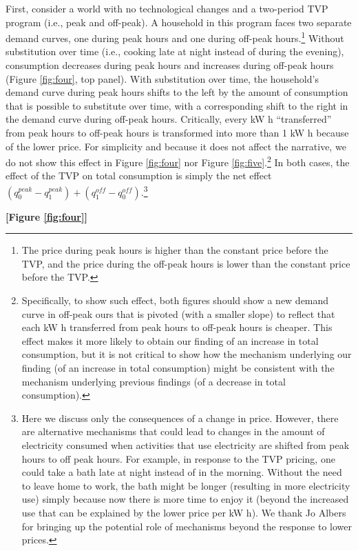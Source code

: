 \documentclass[12pt]{article}
\begin{document}
First, consider a world with no technological changes and a two-period TVP program (i.e., peak and off-peak). A household in this program faces two separate demand curves, one during peak hours and one during off-peak hours.\footnote{The price during peak hours is higher than the constant price before the TVP, and the price during the off-peak hours is lower than the constant price before the TVP.} Without substitution over time (i.e., cooking late at night instead of during the evening), consumption decreases during peak hours and increases during off-peak hours (Figure \ref{fig:four}, top panel). With substitution over time, the household’s demand curve during peak hours shifts to the left by the amount of consumption that is possible to substitute over time, with a corresponding shift to the right in the demand curve during off-peak hours. Critically, every kW h \enquote{transferred} from peak hours to off-peak hours is transformed into more than 1 kW h because of the lower price. For simplicity and because it does not affect the narrative, we do not show this effect in Figure \ref{fig:four} nor Figure \ref{fig:five}.\footnote{Specifically, to show such effect, both figures should show a new demand curve in off-peak ours that is pivoted (with a smaller slope) to reflect that each kW h transferred from peak hours to off-peak hours is cheaper. This effect makes it more likely to obtain our finding of an increase in total consumption, but it is not critical to show how the mechanism underlying our finding (of an increase in total consumption) might be consistent with the mechanism underlying previous findings (of a decrease in total consumption).} In both cases, the effect of the TVP on total consumption is simply the net effect $ \left( q_{0}^{peak}-q_{1}^{peak} \right) + \left( q_{1}^{off}-q_{0}^{off} \right)$.\footnote{Here we discuss only the consequences of a change in price. However, there are alternative mechanisms that could lead to changes in the amount of electricity consumed when activities that use electricity are shifted from peak hours to off peak hours. For example, in response to the TVP pricing, one could take a bath late at night instead of in the morning. Without the need to leave home to work, the bath might be longer (resulting in more electricity use) simply because now there is more time to enjoy it (beyond the increased use that can be explained by the lower price per kW h). We thank Jo Albers for bringing up the potential role of mechanisms beyond the response to lower prices.}

\centerline{\textbf{[Figure \ref{fig:four}]}}
\end{document}

